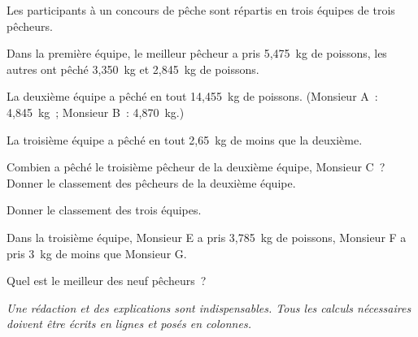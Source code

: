 Les participants à un concours de pêche sont répartis en trois équipes de trois pêcheurs.
\par Dans la première équipe, le meilleur pêcheur a pris 5,475~kg de poissons, les autres ont pêché 3,350~kg et 2,845~kg de poissons.
\par La deuxième équipe a pêché en tout 14,455~kg de poissons. (Monsieur A : 4,845~kg ; Monsieur B : 4,870~kg.)
\par La troisième équipe a pêché en tout 2,65~kg de moins que la deuxième.
\begin{myenumerate}
  \item Combien a pêché le troisième pêcheur de la deuxième équipe, Monsieur C ? Donner le classement des pêcheurs de la deuxième équipe.
  \item Donner le classement des trois équipes.
  \item Dans la troisième équipe, Monsieur E a pris 3,785~kg de poissons, Monsieur F a pris 3~kg de moins que Monsieur G.
\par Quel est le meilleur des neuf pêcheurs ?
\end{myenumerate}
{\em Une rédaction et des explications sont indispensables. Tous les calculs nécessaires doivent être écrits en lignes et posés en colonnes.}
